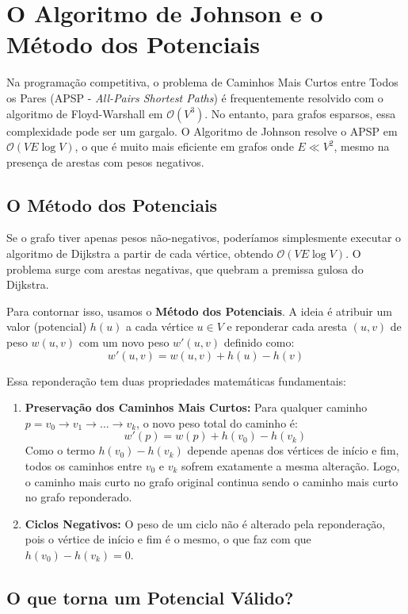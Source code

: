 \section{O Algoritmo de Johnson e o Método dos Potenciais}

Na programação competitiva, o problema de Caminhos Mais Curtos entre Todos os Pares (APSP - \textit{All-Pairs Shortest Paths}) é frequentemente resolvido com o algoritmo de Floyd-Warshall em $\mathcal{O}(V^3)$. No entanto, para grafos esparsos, essa complexidade pode ser um gargalo. O Algoritmo de Johnson resolve o APSP em $\mathcal{O}(V E \log V)$, o que é muito mais eficiente em grafos onde $E \ll V^2$, mesmo na presença de arestas com pesos negativos.

\subsection{O Método dos Potenciais}

Se o grafo tiver apenas pesos não-negativos, poderíamos simplesmente executar o algoritmo de Dijkstra a partir de cada vértice, obtendo $\mathcal{O}(V E \log V)$. O problema surge com arestas negativas, que quebram a premissa gulosa do Dijkstra.

Para contornar isso, usamos o \textbf{Método dos Potenciais}. A ideia é atribuir um valor (potencial) $h(u)$ a cada vértice $u \in V$ e reponderar cada aresta $(u, v)$ de peso $w(u, v)$ com um novo peso $w'(u, v)$ definido como:
$$w'(u, v) = w(u, v) + h(u) - h(v)$$

Essa reponderação tem duas propriedades matemáticas fundamentais:
\begin{enumerate}
    \item \textbf{Preservação dos Caminhos Mais Curtos:} Para qualquer caminho $p = v_0 \rightarrow v_1 \rightarrow \dots \rightarrow v_k$, o novo peso total do caminho é:
    $$w'(p) = w(p) + h(v_0) - h(v_k)$$
    Como o termo $h(v_0) - h(v_k)$ depende apenas dos vértices de início e fim, todos os caminhos entre $v_0$ e $v_k$ sofrem exatamente a mesma alteração. Logo, o caminho mais curto no grafo original continua sendo o caminho mais curto no grafo reponderado.
    \item \textbf{Ciclos Negativos:} O peso de um ciclo não é alterado pela reponderação, pois o vértice de início e fim é o mesmo, o que faz com que $h(v_0) - h(v_k) = 0$.
\end{enumerate}

\subsection{O que torna um Potencial Válido?}


